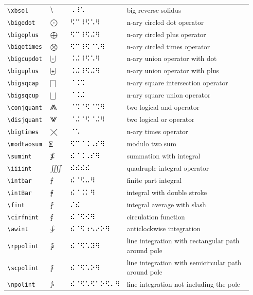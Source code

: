 \documentclass[oneside]{article}
\begin{document}
\begin{longtable}{llll}
\verb|\xbsol| & $\xbsol$ &  ⠠⠸⠡  & {big reverse solidus} \\[2ex]
\verb|\bigodot| & $\bigodot$ &  ⠫⠉⠸⠫⠡⠻  & {n-ary circled dot operator} \\[2ex]
\verb|\bigoplus| & $\bigoplus$ &  ⠫⠉⠸⠫⠬⠻  & {n-ary circled plus operator} \\[2ex]
\verb|\bigotimes| & $\bigotimes$ &  ⠫⠉⠸⠫⠈⠡⠻  & {n-ary circled times operator} \\[2ex]
\verb|\bigcupdot| & $\bigcupdot$ &  ⠨⠬⠸⠫⠡⠻  & {n-ary union operator with dot} \\[2ex]
\verb|\biguplus| & $\biguplus$ &  ⠨⠬⠸⠫⠬⠻  & {n-ary union operator with plus} \\[2ex]
\verb|\bigsqcap| & $\bigsqcap$ &  ⠈⠨⠩  & {n-ary square intersection operator} \\[2ex]
\verb|\bigsqcup| & $\bigsqcup$ &  ⠈⠨⠬  & {n-ary square union operator} \\[2ex]
\verb|\conjquant| & $\conjquant$ &  ⠈⠩⠈⠫⠈⠩⠻  & {two logical and operator} \\[2ex]
\verb|\disjquant| & $\disjquant$ &  ⠈⠬⠈⠫⠈⠬⠻  & {two logical or operator} \\[2ex]
\verb|\bigtimes| & $\bigtimes$ &  ⠈⠡  & {n-ary times operator} \\[2ex]
\verb|\modtwosum| & $\modtwosum$ &  ⠫⠉⠈⠨⠠⠎⠻  & {modulo two sum} \\[2ex]
\verb|\sumint| & $\sumint$ &  ⠮⠈⠨⠠⠎⠻  & {summation with integral} \\[2ex]
\verb|\iiiint| & $\iiiint$ &  ⠮⠮⠮⠮  & {quadruple integral operator} \\[2ex]
\verb|\intbar| & $\intbar$ &  ⠮⠈⠫⠤⠻  & {finite part integral} \\[2ex]
\verb|\intBar| & $\intBar$ &  ⠮⠈⠨⠅⠻  & {integral with double stroke} \\[2ex]
\verb|\fint| & $\fint$ &  ⠌⠮  & {integral average with slash} \\[2ex]
\verb|\cirfnint| & $\cirfnint$ &  ⠮⠈⠫⠪⠻  & {circulation function} \\[2ex]
\verb|\awint| & $\awint$ &  ⠮⠈⠫⠰⠢⠔⠕⠻  & {anticlockwise integration} \\[2ex]
\verb|\rppolint| & $\rppolint$ &  ⠮⠈⠫⠡⠽⠻  & {line integration with rectangular path around pole} \\[2ex]
\verb|\scpolint| & $\scpolint$ &  ⠮⠈⠫⠡⠕⠻  & {line integration with semicircular path around pole} \\[2ex]
\verb|\npolint| & $\npolint$ &  ⠮⠈⠫⠡⠫⠁⠕⠫⠄⠻  & {line integration not including the pole} \\[2ex]

\end{longtable}
\end{document}

